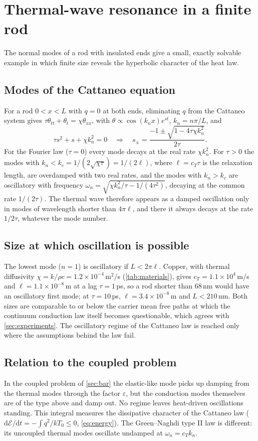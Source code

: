\section{Thermal-wave resonance in a finite rod}\label{sec:thermalmodes}

The normal modes of a rod with insulated ends give a small, exactly solvable example in which finite size reveals the hyperbolic character of the heat law.

\subsection{Modes of the Cattaneo equation}
For a rod $0<x<L$ with $q=0$ at both ends, eliminating $q$ from the Cattaneo system gives $\tau\theta_{tt}+\theta_t=\chi\theta_{xx}$, with $\theta\propto\cos(k_nx)e^{st}$, $k_n=n\pi/L$, and
\begin{equation}
\tau s^2+s+\chi k_n^2=0\quad\Rightarrow\quad s_\pm=\frac{-1\pm\sqrt{1-4\tau\chi k_n^2}}{2\tau}.
\end{equation}
For the Fourier law ($\tau=0$) every mode decays at the real rate $\chi k_n^2$. For $\tau>0$ the modes with $k_n<k_c=1/(2\sqrt{\chi\tau})=1/(2\ell)$, where $\ell=c_T\tau$ is the relaxation length, are overdamped with two real rates, and the modes with $k_n>k_c$ are oscillatory with frequency $\omega_n=\sqrt{\chi k_n^2/\tau-1/(4\tau^2)}$, decaying at the common rate $1/(2\tau)$. The thermal wave therefore appears as a damped oscillation only in modes of wavelength shorter than $4\pi\ell$, and there it always decays at the rate $1/2\tau$, whatever the mode number.

\subsection{Size at which oscillation is possible}
The lowest mode ($n=1$) is oscillatory if $L<2\pi\ell$. Copper, with thermal diffusivity $\chi=k/\rho c=1.2\times10^{-4}$\,m$^2$/s (\cref{tab:materials}), gives $c_T=1.1\times10^{4}$\,m/s and $\ell=1.1\times10^{-8}$\,m at a lag $\tau=1$\,ps, so a rod shorter than $68$\,nm would have an oscillatory first mode; at $\tau=10$\,ps, $\ell=3.4\times10^{-8}$\,m and $L<210$\,nm. Both sizes are comparable to or below the carrier mean free paths at which the continuum conduction law itself becomes questionable, which agrees with \cref{sec:experiments}. The oscillatory regime of the Cattaneo law is reached only where the assumptions behind the law fail.

\subsection{Relation to the coupled problem}
In the coupled problem of \cref{sec:bar} the elastic-like mode picks up damping from the thermal modes through the factor $\varepsilon$, but the conduction modes themselves are of the type above and damp out. No regime leaves heat-driven oscillations standing. This integral measures the dissipative character of the Cattaneo law ($\mathrm{d}\mathcal E/\mathrm{d}t=-\int q^2/kT_0\le0$, \cref{eq:energy}). The Green--Naghdi type II law is different: its uncoupled thermal modes oscillate undamped at $\omega_n=c_Tk_n$.

